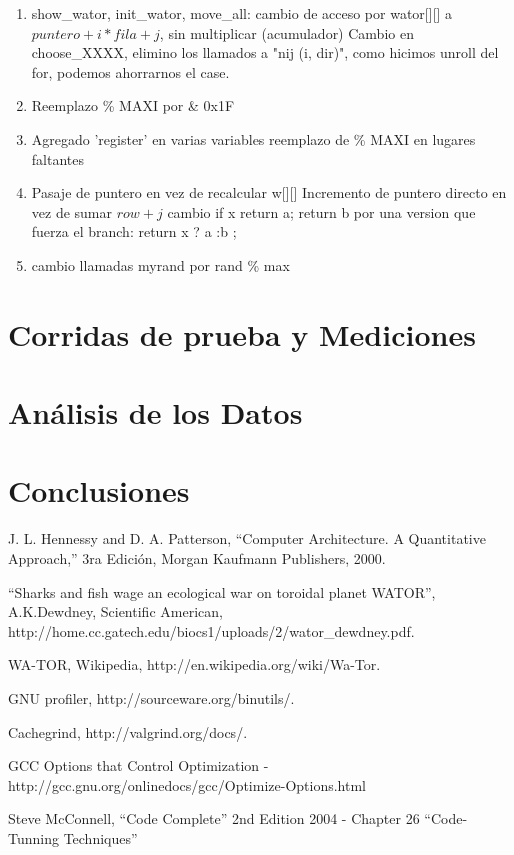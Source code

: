 \documentclass[a4paper,10pt]{article}
\begin{document}
\begin{enumerate}
 \item  show\_wator, init\_wator, move\_all:
	cambio de acceso por wator[][] a $puntero+i*fila+j$, sin multiplicar (acumulador)
   Cambio en choose\_XXXX, elimino los llamados a "nij (i, dir)", como hicimos unroll del for, podemos ahorrarnos el case.
   
 \item Reemplazo \% MAXI por   \& 0x1F
 
 \item Agregado 'register' en varias variables
   reemplazo de \% MAXI en lugares faltantes
   
 \item  Pasaje de puntero en vez de recalcular w[][]
   Incremento de puntero directo en vez de sumar $row+j$
   cambio if x return a; return b por una version que fuerza el branch:
	return x ? a :b ;
	
 \item  cambio llamadas myrand por rand \% max
\end{enumerate}




\section{Corridas de prueba y Mediciones}


\newpage

\section{An\'alisis de los Datos}



\section{Conclusiones}

\begin{thebibliography}{99}

 J. L. Hennessy and D. A. Patterson, ``Computer Architecture. A Quantitative
Approach,'' 3ra Edici\'on, Morgan Kaufmann Publishers, 2000.

 ``Sharks and fish wage an ecological war on toroidal planet WATOR'', A.K.Dewdney, Scientific American,\\
http://home.cc.gatech.edu/biocs1/uploads/2/wator\_dewdney.pdf.

 WA-TOR, Wikipedia, http://en.wikipedia.org/wiki/Wa-Tor.

 GNU profiler, http://sourceware.org/binutils/.

 Cachegrind, http://valgrind.org/docs/.

 GCC Options that Control Optimization - http://gcc.gnu.org/onlinedocs/gcc/Optimize-Options.html

 Steve McConnell, ``Code Complete'' 2nd Edition 2004 - Chapter 26 ``Code-Tunning Techniques''

\end{thebibliography}
\end{document}
